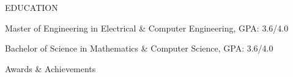\documentclass[10pt]{article}
\begin{document}
\begin{customsection}{EDUCATION}

    {Master of Engineering in Electrical \& Computer Engineering, GPA: 3.6/4.0}

    {Bachelor of Science in Mathematics \& Computer Science, GPA: 3.6/4.0}

\end{customsection}


\begin{customsectionnoskip}{Awards \& Achievements}


\end{customsectionnoskip}

\end{document}
